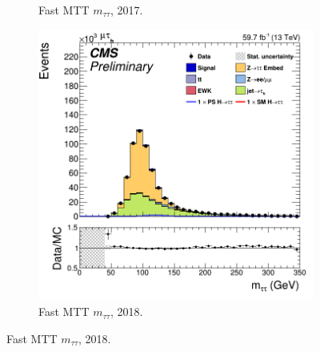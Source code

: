\begin{figure}
\begin{subfigure}[b]{0.33\linewidth}
    \caption{Fast MTT $m_{\tau\tau}$, 2017.} 
    \vspace{0.5ex}
  \end{subfigure} 
    \begin{subfigure}[b]{0.33\linewidth}
    \centering
    \includegraphics[width=\linewidth]{Chapitre7/Images/CtrlPlots/2018/fastMTTditauMass.png} 
    \caption{Fast MTT $m_{\tau\tau}$, 2018.} 
    \vspace{0.5ex}
  \end{subfigure} 


\end{figure}
